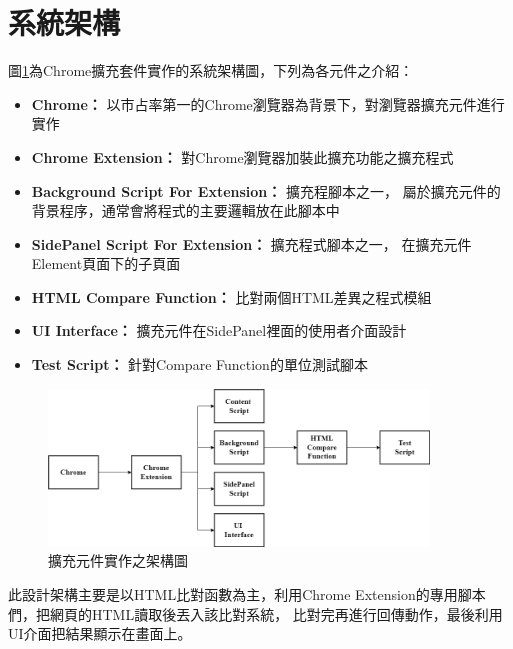 \section{系統架構}\label{s3.2}
圖\ref{f3.4}為Chrome擴充套件實作的系統架構圖，下列為各元件之介紹：

\begin{itemize}
\item\textbf{Chrome：}
以市占率第一的Chrome瀏覽器為背景下，對瀏覽器擴充元件進行實作

\item\textbf{Chrome Extension：}
對Chrome瀏覽器加裝此擴充功能之擴充程式

\item\textbf{Background Script For Extension：}
擴充程腳本之一， 屬於擴充元件的背景程序，通常會將程式的主要邏輯放在此腳本中

\item\textbf{SidePanel Script For Extension：}
擴充程式腳本之一， 在擴充元件Element頁面下的子頁面

\item\textbf{HTML Compare Function：}
比對兩個HTML差異之程式模組

\item\textbf{UI Interface：}
擴充元件在SidePanel裡面的使用者介面設計

\item\textbf{Test Script：}
針對Compare Function的單位測試腳本

\end{itemize}

\begin{figure}[H]
    \centering
    \includegraphics[width=0.9\textwidth]{picture/ch3-systemStucture.png}
    \caption{擴充元件實作之架構圖}
    \label{f3.4}
\end{figure}

此設計架構主要是以HTML比對函數為主，利用Chrome Extension的專用腳本們，把網頁的HTML讀取後丟入該比對系統，
比對完再進行回傳動作，最後利用UI介面把結果顯示在畫面上。

